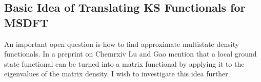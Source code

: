\documentclass[journal=jpclcd,manuscript=letter]{achemso}
\newcommand\m[1]{\mathbf{#1}}
\begin{document}


\subsection{Basic Idea of Translating KS Functionals for MSDFT
\label{sec:basic_ideas_Taylor_series}
}
An important open question is how to find approximate multistate density functionals. 
In a preprint on Chemrxiv \cite{lu_gao_2021_chemrxiv} Lu and Gao mention that a local ground state functional
can be turned into a matrix functional by applying it to the eigenvalues of the matrix density.
I wish to investigate this idea further.
\end{document}
